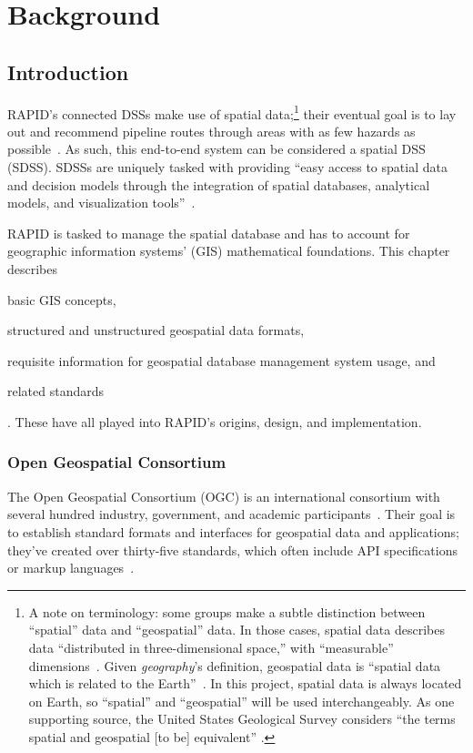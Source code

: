 \chapter{Background}
\label{background}

\section{Introduction}
\label{background_intro}
RAPID's connected DSSs make use of spatial data;\footnote{A note on terminology: some groups make a subtle distinction between ``spatial'' data and ``geospatial'' data. In those cases, spatial data describes data ``distributed in three-dimensional space,'' with ``measurable'' dimensions~\cite{Bhatta2011}. Given \textit{geography}'s definition, geospatial data is ``spatial data which is related to the Earth''~\cite{Bhatta2011}. In this project, spatial data is always located on Earth, so ``spatial'' and ``geospatial'' will be used interchangeably. As one supporting source, the United States Geological Survey considers ``the terms spatial and geospatial [to be] equivalent''
\cite{Bhatta2011}.} their eventual goal is to lay out and recommend pipeline routes through areas with as few hazards as possible~\cite{Dunning2013}. As such, this end-to-end system can be considered a spatial DSS (SDSS). SDSSs are uniquely tasked with providing ``easy access to spatial data and decision models through the integration of spatial databases, analytical models, and visualization tools''~\cite{RedlandsSDSS}.

RAPID is tasked to manage the spatial database and has to account for geographic information systems' (GIS) mathematical foundations. This chapter describes \begin{enumerate*}[label=\itshape\alph*\upshape)]
\item basic GIS concepts,
\item structured and unstructured geospatial data formats,
\item requisite information for geospatial database management system usage, and
\item related standards
\end{enumerate*}. These have all played into RAPID's origins, design, and implementation.

\subsection{Open Geospatial Consortium}
The Open Geospatial Consortium (OGC) is an international consortium with several hundred industry, government, and academic participants~\cite{ogc}. Their goal is to establish standard formats and interfaces for geospatial data and applications; they've created over thirty-five standards, which often include API specifications or markup languages~\cite{ogc}.

